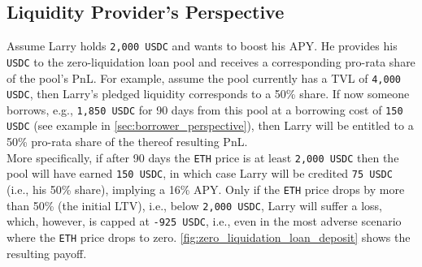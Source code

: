 \documentclass[a4paper]{article}
\begin{document}
\subsection{Liquidity Provider's Perspective}
Assume Larry holds \verb|2,000 USDC| and wants to boost his APY. He provides his \verb|USDC| to the zero-liquidation loan pool and receives a corresponding pro-rata share of the pool's PnL. For example, assume the pool currently has a TVL of \verb|4,000 USDC|, then Larry's pledged liquidity corresponds to a 50\% share. If now someone borrows, e.g., \verb|1,850 USDC| for 90 days from this pool at a borrowing cost of \verb|150 USDC| (see example in \cref{sec:borrower_perspective}), then Larry will be entitled to a 50\% pro-rata share of the thereof resulting PnL.\\

More specifically, if after 90 days the \verb|ETH| price is at least \verb|2,000 USDC| then the pool will have earned \verb|150 USDC|, in which case Larry will be credited \verb|75 USDC| (i.e., his 50\% share), implying a 16\% APY. Only if the \verb|ETH| price drops by more than 50\% (the initial LTV), i.e., below \verb|2,000 USDC|, Larry will suffer a loss, which, however, is capped at \verb|-925 USDC|, i.e., even in the most adverse scenario where the \verb|ETH| price drops to zero. \cref{fig:zero_liquidation_loan_deposit} shows the resulting payoff.
\end{document}
